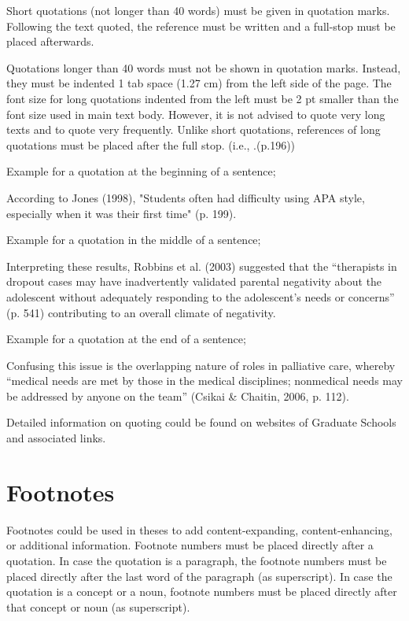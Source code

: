 Short quotations (not longer than 40 words) must be given in quotation marks. Following the text quoted, the reference must be written and a full-stop must be placed afterwards.  

Quotations longer than 40 words must not be shown in quotation  marks. Instead, they must be indented 1 tab space (1.27 cm) from the left side of the page. The font size for long quotations indented from the left must be 2 pt smaller than the font size used in main text body. However, it is not advised to quote very long texts and to quote very frequently. Unlike short quotations, references of long quotations must be placed after the full stop. (i.e., .(p.196))

Example for a quotation at the beginning of a sentence;

According to Jones (1998), "Students often had difficulty using APA style,  especially when it was their first time" (p. 199).

Example for a quotation in the middle of a sentence;

Interpreting these results, Robbins et al. (2003) suggested that the “therapists in dropout cases may have inadvertently validated parental negativity about the adolescent without adequately responding to the adolescent’s needs or concerns” (p. 541) contributing to an overall climate of negativity.

Example for a quotation at the end of a sentence;

Confusing this issue is the overlapping nature of roles in palliative care, whereby “medical needs are met by those in the medical disciplines; nonmedical needs may be addressed by anyone on the team” (Csikai \& Chaitin, 2006, p. 112). 

Detailed information on quoting could be found on websites of Graduate Schools and associated links.

\section{Footnotes}

Footnotes could be used in theses to add content-expanding, content-enhancing, or additional information. 
Footnote numbers must be placed directly after a quotation. In case the quotation is a paragraph, the footnote numbers must be placed directly after the last word of the paragraph (as superscript). In case the quotation is a concept or a noun, footnote numbers must be placed directly after that concept or noun (as superscript). 

